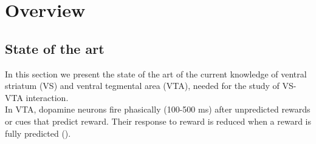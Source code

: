 \chapter{Overview}
\label{chap:Overview}
\section{State of the art}
\label{sec:StateArt}
In this section we present the state of the art of the current knowledge of ventral striatum (VS) and ventral tegmental area (VTA), needed for the study of VS-VTA interaction.\\In VTA, dopamine neurons fire phasically (100-500 ms) after unpredicted rewards or cues that predict reward. Their response to reward is reduced when a reward is fully predicted (\cite{Uchida}). %
